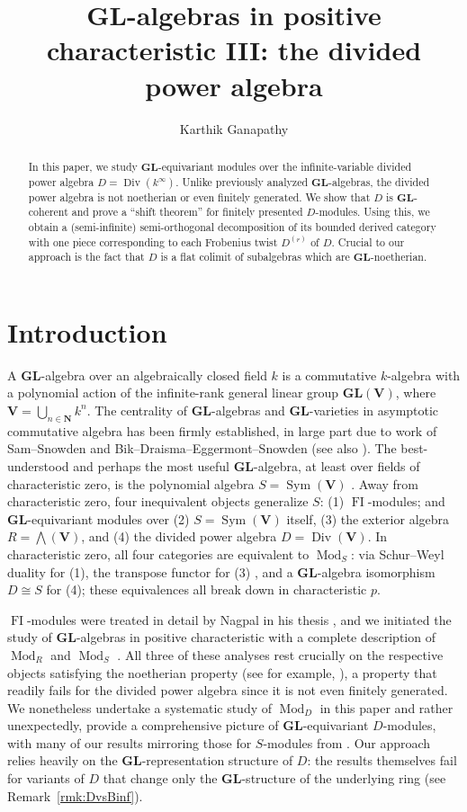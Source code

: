 \documentclass[12pt]{amsart}
\title[GL-algebras in positive characteristic III]{GL-algebras in positive characteristic III: the divided power algebra}
\author{Karthik Ganapathy}
\date{}
\newcommand{\bN}{\mathbf{N}}
\newcommand{\bV}{\mathbf{V}}
\newcommand{\lw}{{\textstyle \bigwedge}}
\DeclareMathOperator{\Div}{Div}
\DeclareMathOperator{\Sym}{Sym}
\DeclareMathOperator{\Mod}{Mod}
\DeclareMathOperator{\FI}{FI}
\newcommand{\Dr}{D^{(r)}}
\newcommand{\GL}{\mathbf{GL}}
\numberwithin{equation}{section}
\theoremstyle{definition}
\theoremstyle{plain}
\begin{document}
\begin{abstract}
In this paper, we study $\GL$-equivariant modules over the infinite-variable divided power algebra $D = \Div(k^{\infty})$. Unlike previously analyzed $\GL$-algebras, the divided power algebra is not noetherian or even finitely generated. We show that $D$ is $\GL$-coherent and prove a ``shift theorem'' for finitely presented $D$-modules. Using this, we obtain a (semi-infinite) semi-orthogonal decomposition of its bounded derived category with one piece corresponding to each Frobenius twist $\Dr$ of $D$. Crucial to our approach is the fact that $D$ is a flat colimit of subalgebras which are $\GL$-noetherian.
\end{abstract}
\maketitle

\section{Introduction}\label{s:intro}
A $\GL$-algebra over an algebraically closed field $k$ is a commutative $k$-algebra with a polynomial action of the infinite-rank general linear group $\GL(\bV)$, where $\bV = \bigcup_{n \in \bN} k^n$. The centrality of $\GL$-algebras and $\GL$-varieties in asymptotic commutative algebra has been firmly established, in large part due to work of Sam--Snowden \cite{ss16gl, ss19gl2} and Bik--Draisma--Eggermont--Snowden \cite{bdes21geo, bdes23uni} (see also \cite{dra19top, ess19gen, bds24charp}).  The best-understood and perhaps the most useful $\GL$-algebra, at least over fields of characteristic zero, is the polynomial algebra $S = \Sym(\bV)$ \cite{cef15fi, ss16gl}. Away from characteristic zero, four inequivalent objects generalize $S$: (1) $\FI$-modules; and $\GL$-equivariant modules over (2) $S = \Sym(\bV)$ itself, (3) the exterior algebra $R = \lw(\bV)$, and (4) the divided power algebra $D = \Div(\bV)$. In characteristic zero, all four categories are equivalent to $\Mod_S$: via Schur--Weyl duality for (1), the transpose functor for (3) \cite{ss12tca}, and a $\GL$-algebra isomorphism $D \cong S$ for (4); these equivalences all break down in characteristic $p$.

$\FI$-modules were treated in detail by Nagpal in his thesis \cite{nag15fi}, and we initiated the study of $\GL$-algebras in positive characteristic with a complete description of $\Mod_R$ \cite{gan22ext} and $\Mod_S$ \cite{gan25pol}. All three of these analyses rest crucially on the respective objects satisfying the noetherian property (see for example, \cite{cefn14fi, ss17grobner, nr19fioi, gan22ext}), a property that readily fails for the divided power algebra since it is not even finitely generated. We nonetheless undertake a systematic study of $\Mod_D$ in this paper and rather unexpectedly, provide a comprehensive picture of $\GL$-equivariant $D$-modules, with many of our results mirroring those for $S$-modules from \cite{gan25pol}. Our approach relies heavily on the $\GL$-representation structure of $D$: the results themselves fail for variants of $D$ that change only the $\GL$-structure of the underlying ring (see Remark~\ref{rmk:DvsBinf}).
\end{document}
